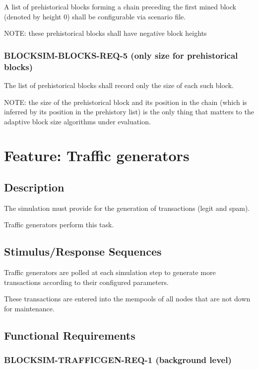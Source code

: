 \documentclass{scrreprt}
\begin{document}
        A list of prehistorical blocks forming a chain preceding the first
        mined block (denoted by height 0) shall be configurable via
        scenario file.

        NOTE: these prehistorical blocks shall have negative block heights

      \subsubsection{BLOCKSIM-BLOCKS-REQ-5 (only size for prehistorical blocks)}

        The list of prehistorical blocks shall record only the size of each
        such block.

        NOTE: the size of the prehistorical block and its position in the chain
        (which is inferred by its position in the prehistory list) is the only
        thing that matters to the adaptive block size algorithms under evaluation.

  \section{Feature: Traffic generators}

    \subsection{Description}

      The simulation must provide for the generation of transactions (legit and
      spam).

      Traffic generators perform this task.

    \subsection{Stimulus/Response Sequences}

      Traffic generators are polled at each simulation step to generate more
      transactions according to their configured parameters.

      These transactions are entered into the mempools of all nodes that are
      not down for maintenance.

    \subsection{Functional Requirements}

      \subsubsection{BLOCKSIM-TRAFFICGEN-REQ-1 (background level)}
\end{document}
